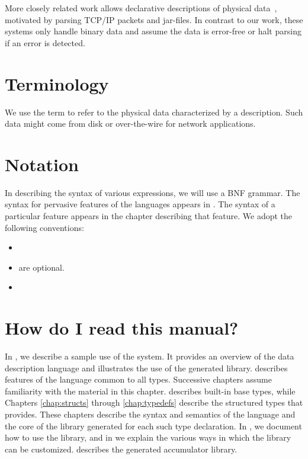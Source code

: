 More closely related work allows declarative descriptions of physical
data~\cite{sigcomm00,erlang-bit-syntax,gpce02}, motivated by parsing
\textsc{TCP/IP} packets and \java{} jar-files.  In contrast to our
work, these systems only handle binary data and assume the data is
error-free or halt parsing if an error is detected.  

\section{Terminology}
We use the term \textit{\external{}} to refer to the physical
data characterized by a \PADS{} description.  Such data might 
come from disk or over-the-wire for network applications.

\section{Notation}
In describing the syntax of various \PADSL{} expressions, we will use
a BNF grammar.  The syntax for pervasive features of the languages
appears in .  The syntax of a particular
feature appears in the chapter describing that feature.
We adopt the following conventions:
\begin{itemize}
\item {}
\item {} are optional.
\item {}

\end{itemize}

\section{How do I read this manual?}
In , we describe a sample use of the \PADS{}
system. It provides an overview of the data description language and
illustrates the use of the generated library.
 describes features of the \PADS{}
language common to all \padsl{} types.  Successive chapters assume
familiarity with the material in this chapter.
 describes built-in \padsl{} base types, while
Chapters \ref{chap:structs} through \ref{chap:typedefs} describe the
structured types that \padsl{} provides. These chapters describe the
syntax and semantics of the \pads{} language and the core of the
library generated for each such type declaration.
In , we document how to use the \pads{}
library, and in  we explain the various
ways in which the \pads{} library can be customized. 
 describes the generated accumulator
library.


